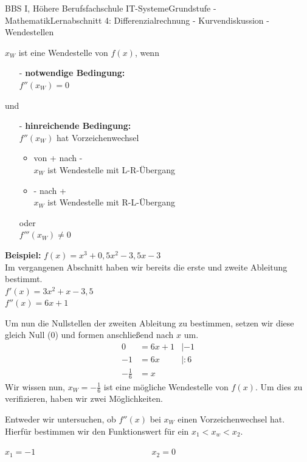 \documentclass[11pt,twocolumn,oneside,openany,headings=optiontotoc,11pt,numbers=noenddot]{article}
\begin{document}
\begin{worksheet}{BBS I, Höhere Berufsfachschule IT-Systeme}{Grundstufe - Mathematik}{Lernabschnitt 4: Differenzialrechnung - Kurvendiskussion - Wendestellen}
		\begin{framed}
			\(x_W\) ist eine Wendestelle von \(f(x)\), wenn
			\begin{itemize}
				\item[-] \textbf{notwendige Bedingung:}\\
				\(f''(x_W) = 0\)
			\end{itemize}
			und
			\begin{itemize}
				\item[-] \textbf{hinreichende Bedingung:}\\
				\(f''(x_W)\) hat Vorzeichenwechsel
				\begin{itemize}
					\item von \glqq{}+\grqq{} nach \glqq{}-\grqq{}\\
					\(x_W\) ist Wendestelle mit L-R-Übergang
					\item \glqq{}-\grqq{} nach \glqq{}+\grqq{}\\
					\(x_W\) ist Wendestelle mit R-L-Übergang
				\end{itemize}
				oder\\
				\(f'''(x_W)\neq 0\)\\
			\end{itemize}
		\end{framed}
		\newpage
		\noindent
		\textbf{Beispiel:} \(f(x) = x^3 + 0,5x^2 -3,5x -3\)\\
		Im vergangenen Abschnitt haben wir bereits die erste und zweite Ableitung bestimmt.\\
		\(f'(x) = 3x^2 + x -3,5\)\\
		\(f''(x) = 6x + 1\)\\
		\par\noindent
		Um nun die Nullstellen der zweiten Ableitung zu bestimmen, setzen wir diese gleich Null (0) und formen anschließend nach \(x\) um.
		\begin{align*}
			0 & = 6x +1 & |-1\\
			-1 & = 6x & |:6\\
			-\frac{1}{6} & = x
		\end{align*}
		Wir wissen nun, \(x_W = -\frac{1}{6}\) ist eine mögliche Wendestelle von \(f(x)\). Um dies zu verifizieren, haben wir zwei Möglichkeiten.\\
		\par\noindent
		Entweder wir untersuchen, ob \(f''(x)\) bei \(x_W\) einen Vorzeichenwechsel hat. Hierfür bestimmen wir den Funktionswert für ein \(x_1 < x_w < x_2\).
		\begin{tabbing}
			\(x_1 = -1\) ~~~~~~~~~~~~~~~~~~~~~~~~~~ \= \(x_2 = 0\)\\

\end{tabbing}
\end{worksheet}
\end{document}
